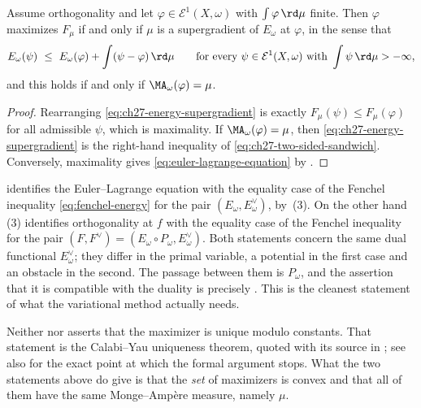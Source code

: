 \begin{corollary}
\label{cor:ch27-euler-lagrange-supergradient}
Assume orthogonality and let \(\varphi\in\mathcal E^1(X,\omega)\) with
\(\int\varphi\,\rd\mu\) finite.  Then \(\varphi\) maximizes \(F_\mu\) if and
only if \(\mu\) is a supergradient of \(E_\omega\) at \(\varphi\), in the
sense that
\begin{equation}\label{eq:ch27-energy-supergradient}
 E_\omega(\psi)\ \leq\ E_\omega(\varphi)+\int(\psi-\varphi)\,\rd\mu
 \qquad\text{for every }\psi\in\mathcal E^1(X,\omega)
 \text{ with }\int\psi\,\rd\mu>-\infty,
\end{equation}
and this holds if and only if \(\MA_\omega(\varphi)=\mu\).
\end{corollary}

\begin{proof}
Rearranging \eqref{eq:ch27-energy-supergradient} is exactly
\(F_\mu(\psi)\leq F_\mu(\varphi)\) for all admissible \(\psi\), which is
maximality.  If \(\MA_\omega(\varphi)=\mu\), then
\eqref{eq:ch27-energy-supergradient} is the right-hand inequality of
\eqref{eq:ch27-two-sided-sandwich}.  Conversely, maximality gives
\eqref{eq:euler-lagrange-equation} by
.
\end{proof}

\begin{remark}
\label{rem:ch27-two-legendre}
 identifies the Euler--Lagrange
equation with the equality case of the Fenchel inequality
\eqref{eq:fenchel-energy} for the pair \((E_\omega,E^\vee_\omega)\), by
\,(3).  On the other hand
\,(3) identifies orthogonality at
\(f\) with the equality case of the Fenchel inequality for the pair
\((F,F^\vee)=(E_\omega\circ P_\omega,E^\vee_\omega)\).  Both statements
concern the same dual functional \(E^\vee_\omega\); they differ in the
primal variable, a potential in the first case and an obstacle in the
second.  The passage between them is \(P_\omega\), and the assertion that
it is compatible with the duality is precisely
.  This is the cleanest
statement of what the variational method actually needs.
\end{remark}

\begin{remark}
\label{rem:ch27-uniqueness-pointer}
Neither  nor
 asserts that the maximizer is
unique modulo constants.  That statement is the Calabi--Yau uniqueness
theorem, quoted with its source in
; see also
 for the exact point at which the formal
argument stops.  What the two statements above do give is that the
\emph{set} of maximizers is convex and that all of them have the same
Monge--Amp\`ere measure, namely \(\mu\).
\end{remark}

